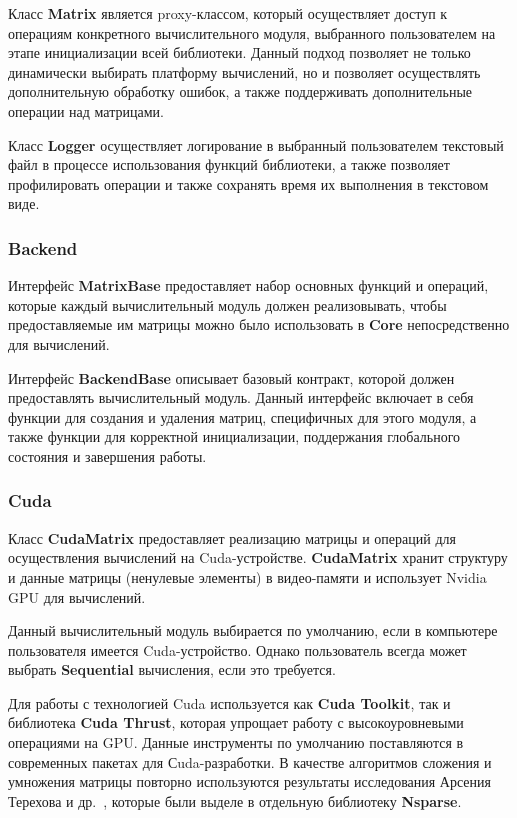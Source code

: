 Класс \textbf{Matrix} является proxy-классом, который осуществляет доступ к операциям конкретного вычислительного модуля, выбранного пользователем на этапе инициализации всей библиотеки.
Данный подход позволяет не только динамически выбирать платформу вычислений, 
но и позволяет осуществлять дополнительную обработку ошибок, 
а также поддерживать дополнительные операции над матрицами.

Класс \textbf{Logger} осуществляет логирование в выбранный пользователем текстовый файл в процессе использования функций библиотеки, а также позволяет профилировать операции и также сохранять время их выполнения в текстовом виде.

\subsubsection*{Backend}

Интерфейс \textbf{MatrixBase} предоставляет набор основных функций и операций, которые каждый вычислительный модуль должен реализовывать, чтобы предоставляемые им матрицы можно было использовать в \textbf{Core} непосредственно для вычислений.

Интерфейс \textbf{BackendBase} описывает базовый контракт, которой должен предоставлять вычислительный модуль. Данный интерфейс включает в себя функции для создания и удаления матриц, специфичных для этого модуля, а также функции для корректной инициализации, поддержания глобального состояния и завершения работы.

\subsubsection*{Cuda}

Класс \textbf{CudaMatrix} предоставляет реализацию матрицы и операций для осуществления вычислений на Cuda-устройстве. \textbf{CudaMatrix} хранит структуру и данные матрицы (ненулевые элементы) в видео-памяти и использует Nvidia GPU для вычислений. 

Данный вычислительный модуль выбирается по умолчанию, если в компьютере пользователя имеется Cuda-устройство.
Однако пользователь всегда может выбрать \textbf{Sequential} вычисления, если это требуется. 

Для работы с технологией Cuda используется как \textbf{Cuda Toolkit}, так и библиотека \textbf{Cuda Thrust}, которая упрощает работу с высокоуровневыми операциями на GPU. Данные инструменты по умолчанию поставляются в современных пакетах для Сuda-разработки. В качестве алгоритмов сложения и умножения матрицы повторно используются результаты исследования Арсения Терехова и др.~\cite{inproceedings:cfqp_matrix_with_single_source}, которые были выделе в отдельную библиотеку \textbf{Nsparse}.

